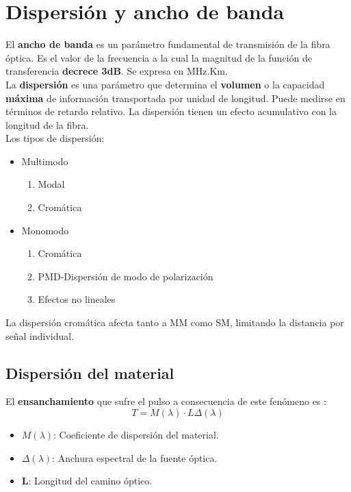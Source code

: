 \documentclass[
	12pt, %
	fleqn, %
	a4paper, %
	oneside, %
]{LegrandOrangeBook}
\begin{document}
\section{Dispersión y ancho de banda}
El \textbf{ancho de banda} es un parámetro fundamental de transmisión de la fibra óptica. Es el valor de la frecuencia a la cual la magnitud de la función de transferencia \textbf{decrece 3dB}. Se expresa en MHz.Km.\\
La \textbf{dispersión} es una parámetro que determina el \textbf{volumen} o la capacidad \textbf{máxima} de información transportada por unidad de longitud. Puede medirse en términos de retardo relativo. La dispersión tienen un efecto acumulativo con la longitud de la fibra.\\
Los tipos de dispersión:
\begin{itemize}
\item Multimodo
\begin{enumerate}
\item Modal
\item Cromática
\end{enumerate}
\item Monomodo
\begin{enumerate}
\item Cromática
\item PMD-Dispersión de modo de polarización
\item Efectos no lineales
\end{enumerate}
\end{itemize}
La dispersión cromática afecta tanto a MM como SM, limitando la distancia por señal individual.
\subsection{Dispersión del material}
El \textbf{ensanchamiento} que sufre el pulso a consecuencia de este fenómeno es :
\begin{equation}
T=M(\lambda)\cdot L\Delta(\lambda)
\end{equation}
\begin{itemize}
\item $M(\lambda)$: Coeficiente de dispersión del material.
\item $\Delta(\lambda)$: Anchura espectral de la fuente óptica.
\item \textbf{L}: Longitud del camino óptico.
\end{itemize}
\end{document}
